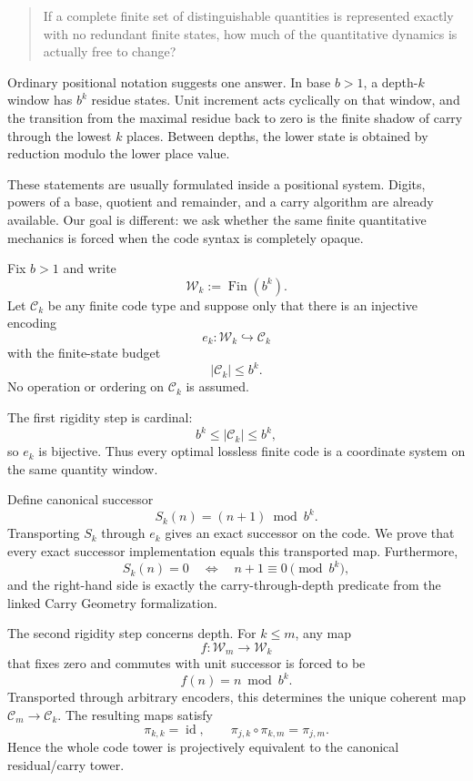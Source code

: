 \documentclass[11pt]{article}
\theoremstyle{definition}
\newcommand{\Fin}{\operatorname{Fin}}
\newcommand{\card}[1]{\left|#1\right|}
\newcommand{\id}{\operatorname{id}}
\newcommand{\Code}{\mathcal{C}}
\newcommand{\Window}{\mathcal{W}}
\newcommand{\Succ}{S}
\newcommand{\Proj}{\pi}
\begin{document}
\begin{quote}
If a complete finite set of distinguishable quantities is represented exactly with no redundant finite states, how much of the quantitative dynamics is actually free to change?
\end{quote}

Ordinary positional notation suggests one answer. In base $b>1$, a depth-$k$ window has $b^k$ residue states. Unit increment acts cyclically on that window, and the transition from the maximal residue back to zero is the finite shadow of carry through the lowest $k$ places. Between depths, the lower state is obtained by reduction modulo the lower place value.

These statements are usually formulated inside a positional system. Digits, powers of a base, quotient and remainder, and a carry algorithm are already available. Our goal is different: we ask whether the same finite quantitative mechanics is forced when the code syntax is completely opaque.

Fix $b>1$ and write
\[
  \Window_k := \Fin(b^k).
\]
Let $\Code_k$ be any finite code type and suppose only that there is an injective encoding
\[
  e_k:\Window_k\hookrightarrow\Code_k
\]
with the finite-state budget
\[
  \card{\Code_k}\le b^k.
\]
No operation or ordering on $\Code_k$ is assumed.

The first rigidity step is cardinal:
\[
  b^k\le\card{\Code_k}\le b^k,
\]
so $e_k$ is bijective. Thus every optimal lossless finite code is a coordinate system on the same quantity window.

Define canonical successor
\[
  \Succ_k(n)=(n+1)\bmod b^k.
\]
Transporting $\Succ_k$ through $e_k$ gives an exact successor on the code. We prove that every exact successor implementation equals this transported map. Furthermore,
\[
  \Succ_k(n)=0
  \quad\Longleftrightarrow\quad
  n+1\equiv0\pmod{b^k},
\]
and the right-hand side is exactly the carry-through-depth predicate from the linked Carry Geometry formalization.

The second rigidity step concerns depth. For $k\le m$, any map
\[
  f:\Window_m\to\Window_k
\]
that fixes zero and commutes with unit successor is forced to be
\[
  f(n)=n\bmod b^k.
\]
Transported through arbitrary encoders, this determines the unique coherent map $\Code_m\to\Code_k$. The resulting maps satisfy
\[
  \Proj_{k,k}=\id,
  \qquad
  \Proj_{j,k}\circ\Proj_{k,m}=\Proj_{j,m}.
\]
Hence the whole code tower is projectively equivalent to the canonical residual/carry tower.
\end{document}
